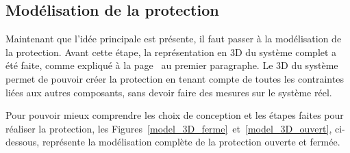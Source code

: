 \begin{minipage}{\textwidth}
    \subsection{Modélisation de la protection}
    Maintenant que l'idée principale est présente, il faut passer à la modélisation de la protection. Avant cette étape, la représentation en 3D du système complet a été faite, comme expliqué à la page~\pageref{modelisation_3D} au premier paragraphe. Le 3D du système permet de pouvoir créer la protection en tenant compte de  toutes les contraintes liées aux autres composants, sans devoir faire des mesures sur le système réel.

    Pour pouvoir mieux comprendre les choix de conception et les étapes faites pour réaliser la protection, les Figures~\ref{model_3D_ferme}~et~\ref{model_3D_ouvert}, ci-dessous, représente la modélisation complète de la protection ouverte et fermée.


\end{minipage}
